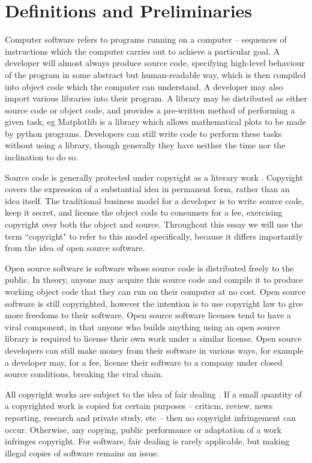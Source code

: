 \section{Definitions and Preliminaries}

Computer software refers to programs running on a computer -- sequences of instructions which the computer carries out to achieve a particular goal. A developer will almost always produce source code, specifying high-level behaviour of the program in some abstract but human-readable way, which is then compiled into object code which the computer can understand. A developer may also import various libraries into their program. A library may be distributed as either source code or object code, and provides a pre-written method of performing a given task, eg Matplotlib %
is a library which allows mathematical plots to be made by python programs. Developers can still write code to perform these tasks without using a library, though generally they have neither the time nor the inclination to do so.

Source code is generally protected under copyright as a literary work %
. Copyright covers the expression of a substantial idea in permanent form, rather than an idea itself. The traditional business model for a developer is to write source code, keep it secret, and license the object code to consumers for a fee, exercising copyright over both the object and source. Throughout this essay we will use the term ``copyright" to refer to this model specifically, because it differs importantly from the idea of open source software.

Open source software is software whose source code is distributed freely to the public. In theory, anyone may acquire this source code and compile it to produce working object code that they can run on their computer at no cost. Open source software is still copyrighted, however the intention is to use copyright law to give more freedoms to their software. Open source software licenses tend to have a viral component, in that anyone who builds anything using an open source library is required to license their own work under a similar license. Open source developers can still make money from their software in various ways, for example a developer may, for a fee, license their software to a company under closed source conditions, breaking the viral chain.

All copyright works are subject to the idea of fair dealing%
. If a small quantity of a copyrighted work is copied for certain purposes -- criticm, review, news reporting, research and private study, etc -- then no copyright infringement can occur. Otherwise, any copying, public performance or adaptation of a work infringes copyright. For software, fair dealing is rarely applicable, but making illegal copies of software remains an issue.

